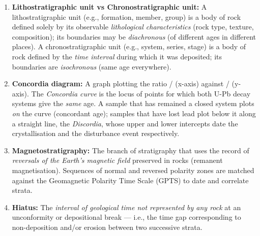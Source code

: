 \documentclass[11pt]{article}
\newcommand{\cle}[1]{{\popxbold\color{popdark}#1}}
\begin{document}
\begin{corrige}
\begin{enumerate}
\item \textbf{Lithostratigraphic unit vs Chronostratigraphic unit:} A \cle{lithostratigraphic unit} (e.g., formation, member, group) is a body of rock defined solely by its observable \emph{lithological characteristics} (rock type, texture, composition); its boundaries may be \emph{diachronous} (of different ages in different places). A \cle{chronostratigraphic unit} (e.g., system, series, stage) is a body of rock defined by the \emph{time interval} during which it was deposited; its boundaries are \emph{isochronous} (same age everywhere).

\item \textbf{Concordia diagram:} A graph plotting the ratio / (x-axis) against / (y-axis). The \emph{Concordia curve} is the locus of points for which both U-Pb decay systems give the \emph{same} age. A sample that has remained a closed system plots \emph{on} the curve (concordant age); samples that have lost lead plot below it along a straight line, the \emph{Discordia}, whose upper and lower intercepts date the crystallisation and the disturbance event respectively.

\item \textbf{Magnetostratigraphy:} The branch of stratigraphy that uses the record of \emph{reversals of the Earth's magnetic field} preserved in rocks (remanent magnetisation). Sequences of normal and reversed polarity zones are matched against the \cle{Geomagnetic Polarity Time Scale (GPTS)} to date and correlate strata.

\item \textbf{Hiatus:} The \emph{interval of geological time not represented by any rock} at an unconformity or depositional break — i.e., the time gap corresponding to non-deposition and/or erosion between two successive strata.
\end{enumerate}
\end{corrige}
\end{document}
